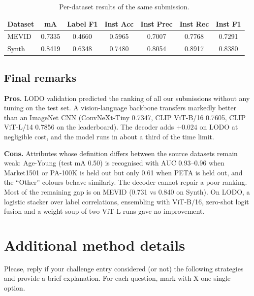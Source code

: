 \documentclass[a4paper, 10pt, conference]{ieeeconf}
\begin{document}
\begin{table}[h]
\centering
\caption{Per-dataset results of the same submission.}
\label{tab:datasets}
\setlength{\tabcolsep}{3.5pt}
\begin{tabular}{lcccccc}
\toprule
Dataset & mA & Label F1 & Inst Acc & Inst Prec & Inst Rec & Inst F1 \\
\midrule
MEVID & 0.7335 & 0.4660 & 0.5965 & 0.7007 & 0.7768 & 0.7291 \\
Synth & 0.8419 & 0.6348 & 0.7480 & 0.8054 & 0.8917 & 0.8380 \\
\bottomrule
\end{tabular}
\end{table}

\subsection{Final remarks}
\textbf{Pros.} LODO validation predicted the ranking of all our submissions without any tuning on the test set. A vision-language backbone transfers markedly better than an ImageNet CNN (ConvNeXt-Tiny 0.7347, CLIP ViT-B/16 0.7605, CLIP ViT-L/14 0.7856 on the leaderboard). The decoder adds $+0.024$ on LODO at negligible cost, and the model runs in about a third of the time limit.

\textbf{Cons.} Attributes whose definition differs between the source datasets remain weak: Age-Young (test mA 0.50) is recognised with AUC 0.93--0.96 when Market1501 or PA-100K is held out but only 0.61 when PETA is held out, and the ``Other'' colours behave similarly. The decoder cannot repair a poor ranking. Most of the remaining gap is on MEVID (0.731 vs 0.840 on Synth). On LODO, a logistic stacker over label correlations, ensembling with ViT-B/16, zero-shot logit fusion and a weight soup of two ViT-L runs gave no improvement.


\section{Additional method details}
Please, reply if your challenge entry considered (or not) the following strategies and provide a brief explanation. For each question, mark with X one single option. \\
\end{document}
